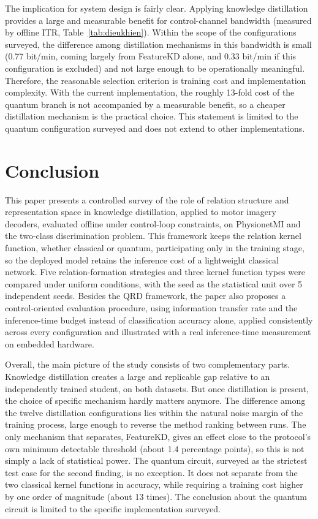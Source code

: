 The implication for system design is fairly clear. Applying
knowledge distillation provides a large and measurable benefit for
control-channel bandwidth (measured by offline ITR,
Table~\ref{tab:dieukhien}). Within the scope of the configurations
surveyed, the difference among distillation mechanisms in this
bandwidth is small (0.77 bit/min, coming largely from FeatureKD
alone, and 0.33 bit/min if this configuration is excluded) and not
large enough to be operationally meaningful. Therefore, the
reasonable selection criterion is training cost and implementation
complexity. With the current implementation, the roughly 13-fold
cost of the quantum branch is not accompanied by a measurable
benefit, so a cheaper distillation mechanism is the practical
choice. This statement is limited to the quantum configuration
surveyed and does not extend to other implementations.

\section{Conclusion}
\label{sec:ketluan}

This paper presents a controlled survey of the role of relation
structure and representation space in knowledge distillation,
applied to motor imagery decoders, evaluated offline under
control-loop constraints, on PhysionetMI and the two-class
discrimination problem. This framework keeps the relation kernel
function, whether classical or quantum, participating only in the
training stage, so the deployed model retains the inference cost of
a lightweight classical network. Five relation-formation strategies
and three kernel function types were compared under uniform
conditions, with the seed as the statistical unit over 5 independent
seeds. Besides the QRD framework, the paper also proposes a
control-oriented evaluation procedure, using information transfer
rate and the inference-time budget instead of classification
accuracy alone, applied consistently across every configuration and
illustrated with a real inference-time measurement on embedded
hardware.

Overall, the main picture of the study consists of two complementary
parts. Knowledge distillation creates a large and replicable gap
relative to an independently trained student, on both datasets. But
once distillation is present, the choice of specific mechanism
hardly matters anymore. The difference among the twelve distillation
configurations lies within the natural noise margin of the training
process, large enough to reverse the method ranking between runs.
The only mechanism that separates, FeatureKD, gives an effect close
to the protocol's own minimum detectable threshold (about 1.4
percentage points), so this is not simply a lack of statistical
power. The quantum circuit, surveyed as the strictest test case for
the second finding, is no exception. It does not separate from the
two classical kernel functions in accuracy, while requiring a
training cost higher by one order of magnitude (about 13 times). The
conclusion about the quantum circuit is limited to the specific
implementation surveyed.

